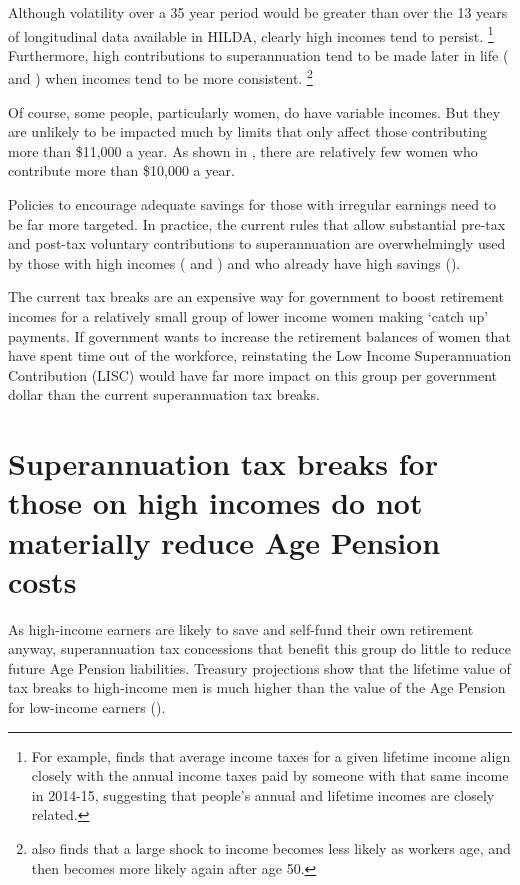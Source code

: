 \documentclass{grattanAlpha}
\begin{document}
Although volatility over a 35 year period would be greater than over the 13 years of longitudinal data available in HILDA, clearly high incomes tend to persist.%
\footnote{For example, \textcite[][96]{ProductivityCommission2015-Tax-and-transfer-incidence}  finds that average income taxes for a given lifetime income align closely with the annual income taxes paid by someone with that same income in 2014-15, suggesting that people’s annual and lifetime incomes are closely related.}
Furthermore, high contributions to superannuation tend to be made later in life ( and ) when incomes tend to be more consistent.%
\footnote{\textcite{Karahan2015} also finds that a large shock to income becomes less likely as workers age, and then becomes more likely again after age 50.} 

Of course, some people, particularly women, do have variable incomes. But they are unlikely to be impacted much by limits that only affect those contributing more than \$11,000 a year. As shown in , there are relatively few women who contribute more than \$10,000 a year. 

Policies to encourage adequate savings for those with irregular earnings need to be far more targeted. In practice, the current rules that allow substantial pre-tax and post-tax voluntary contributions to superannuation are overwhelmingly used by those with high incomes ( and ) and who already have high savings (). 

The current tax breaks are an expensive way for government to boost retirement incomes for a relatively small group of lower income women making ‘catch up’ payments. If government wants to increase the retirement balances of women that have spent time out of the workforce, reinstating the Low Income Superannuation Contribution (LISC) would have far more impact on this group per government dollar than the current superannuation tax breaks. 

\section{Superannuation tax breaks for those on high incomes do not materially reduce Age Pension costs}\label{sec:SUPER-3-5}
As high-income earners are likely to save and self-fund their own retirement anyway, superannuation tax concessions that benefit this group do little to reduce future Age Pension liabilities. Treasury projections show that the lifetime value of tax breaks to high-income men is much higher than the value of the Age Pension for low-income earners (). 
\end{document}
